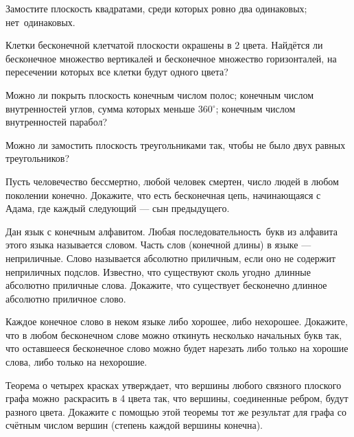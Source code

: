 \documentclass[a4paper,11pt]{article}
\begin{document}

Замостите плоскость квадратами, среди которых
ровно два одинаковых;
нет~\hbox{одинаковых.}

Клетки бесконечной клетчатой плоскости окрашены в 2 цвета.
Найд\"ет\-ся ли бесконечное множество вертикалей и
бесконечное множество горизонталей, на пересечении которых
все клетки будут одного цвета?


 Можно ли покрыть плоскость
   конечным числом полос;
 конечным числом внутренностей углов, сумма которых
меньше 360$^\circ$;
 конечным числом внутренностей парабол?

Можно ли замостить плоскость треугольниками так, чтобы не было двух равных треугольников?




Пусть человечество бессмертно, любой человек смертен,
число людей в любом поколении конечно. Докажите, что есть %
бесконечная цепь, %
начинающаяся с Адама, где
каждый следующий %
--- сын предыдущего.




Дан язык с конечным алфавитом.
Любая последовательность~букв из алфавита этого языка называется словом.
Часть слов (конечной длины) в языке --- неприличные.
Слово называется абсолютно приличным, если
оно не содержит неприличных подслов.
Известно, что существуют сколь угодно~длин\-ные абсолютно
приличные слова. Докажите,
что существует бесконечно длинное абсолютно приличное слово.


 Каждое конечное слово в неком языке либо
хорошее, либо нехорошее. Докажите, что в любом бесконечном слове
можно откинуть несколько начальных букв так, что оставшееся
бесконечное слово можно будет нарезать либо только на хорошие
слова, либо только на нехорошие.

Теорема о четырех красках утверждает, что вершины любого связного
плоского графа можно~раскрасить в %
4 цвета так, что вершины,
соединенные ребром, будут разного цвета.
Докажите с помощью этой теоремы тот же результат для графа
со сч\"етным числом вершин (степень каждой вершины конечна).
\end{document}
